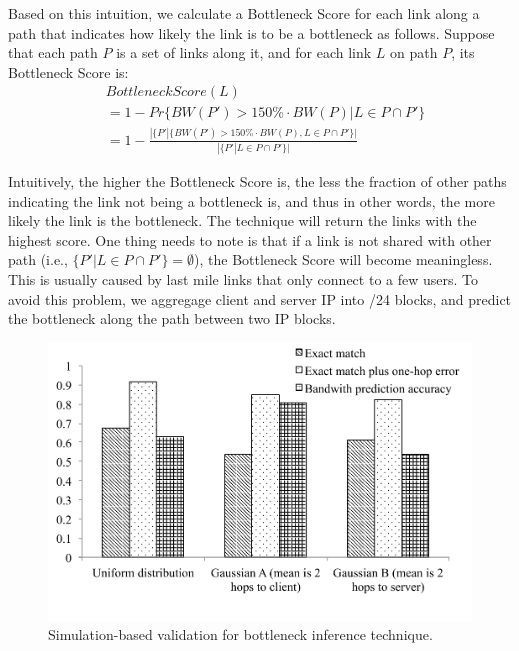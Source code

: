 Based on this intuition, we calculate a Bottleneck Score for each link along a path that indicates how likely the link is to be a bottleneck as follows. Suppose that each path $P$ is a set of links along it, and for each link $L$ on path $P$, its Bottleneck Score is:
\begin{align*}
&BottleneckScore(L)\\
&=1-Pr\{BW(P') > 150\%\cdot BW(P) | L \in P \cap P'\}\\
&=1-\frac{|\{P'|\{BW(P') > 150\%\cdot BW(P), L \in P \cap P'\}|}{|\{P'|L \in P \cap P'\}|}
\end{align*}

Intuitively, the higher the Bottleneck Score is, the less the fraction of other paths indicating the link not being a bottleneck is, and thus in other words, the more likely the link is the bottleneck. The technique will return the links with the highest score. 
One thing needs to note is that if a link is not shared with other path (i.e., $\{P'|L\in P\cap P'\}=\emptyset$), the Bottleneck Score will become meaningless. This is usually caused by last mile links that only connect to a few users.
To avoid this problem, we aggregage client and server IP into /24 blocks, and predict the bottleneck along the path between two IP blocks. 





\begin{figure}[h]
\begin{center}
\includegraphics[scale=0.4] {figures/bottle-sim-bar-w-prediction.pdf}
\vspace{-0.9cm}
\caption{Simulation-based validation for bottleneck inference technique.}
\label{fig:cdn-criticalAttributeSets}
\end{center}
\end{figure}

